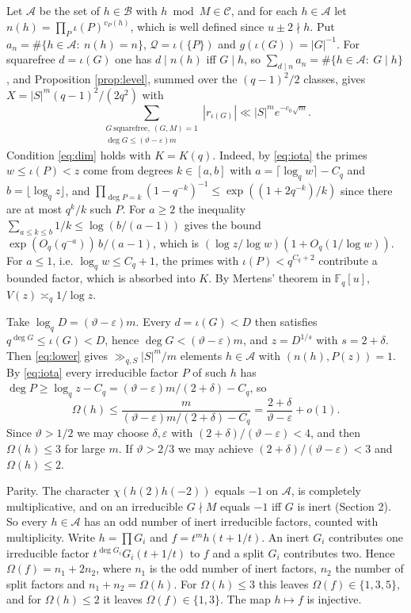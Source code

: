 \documentclass[11pt]{amsart}
\makeatletter
\theoremstyle{definition}
\renewenvironment{proof}[1][\proofname]{\par\pushQED{\qed}\normalfont\topsep6\p@\@plus6\p@\relax\trivlist\item[\hskip\labelsep\upshape #1\@addpunct{.}]\ignorespaces}{\popQED\endtrivlist\@endpefalse}
\newcommand{\F}{\mathbb{F}}
\newcommand{\cB}{\mathcal{B}}
\newcommand{\cC}{\mathcal{C}}
\makeatother
\begin{document}
\begin{proof}[Proof of Corollary \ref{cor:sieve}]
Let $\mathcal A$ be the set of $h\in\cB$ with $h\bmod M\in\cC$, and for each $h\in\mathcal A$ let $n(h)=\prod_P\iota(P)^{v_P(h)}$, which is well defined since $u\pm2\nmid h$. Put $a_n=\#\{h\in\mathcal A:\ n(h)=n\}$, $\mathcal Q=\iota(\{P\})$ and $g(\iota(G))=|G|^{-1}$. For squarefree $d=\iota(G)$ one has $d\mid n(h)$ iff $G\mid h$, so $\sum_{d\mid n}a_n=\#\{h\in\mathcal A:\ G\mid h\}$, and Proposition \ref{prop:level}, summed over the $(q-1)^2/2$ classes, gives $X=|S|^m(q-1)^2/(2q^2)$ with
\[
\sum_{\substack{G\ \text{squarefree},\ (G,M)=1\\ \deg G\le(\vartheta-\varepsilon)m}}|r_{\iota(G)}|\ll|S|^me^{-c_0\sqrt m}.
\]
Condition \eqref{eq:dim} holds with $K=K(q)$. Indeed, by \eqref{eq:iota} the primes $w\le\iota(P)<z$ come from degrees $k\in[a,b]$ with $a=\lceil\log_qw\rceil-C_q$ and $b=\lfloor\log_qz\rfloor$, and $\prod_{\deg P=k}(1-q^{-k})^{-1}\le\exp((1+2q^{-k})/k)$ since there are at most $q^k/k$ such $P$. For $a\ge2$ the inequality $\sum_{a\le k\le b}1/k\le\log(b/(a-1))$ gives the bound $\exp(O_q(q^{-a}))\,b/(a-1)$, which is $(\log z/\log w)(1+O_q(1/\log w))$. For $a\le1$, i.e. $\log_qw\le C_q+1$, the primes with $\iota(P)<q^{C_q+2}$ contribute a bounded factor, which is absorbed into $K$. By Mertens' theorem in $\F_q[u]$, $V(z)\asymp_q1/\log z$.

Take $\log_qD=(\vartheta-\varepsilon)m$. Every $d=\iota(G)<D$ then satisfies $q^{\deg G}\le\iota(G)<D$, hence $\deg G<(\vartheta-\varepsilon)m$, and $z=D^{1/s}$ with $s=2+\delta$. Then \eqref{eq:lower} gives $\gg_{q,S}|S|^m/m$ elements $h\in\mathcal A$ with $(n(h),P(z))=1$. By \eqref{eq:iota} every irreducible factor $P$ of such $h$ has $\deg P\ge\log_qz-C_q=(\vartheta-\varepsilon)m/(2+\delta)-C_q$, so
\[
\Omega(h)\le\frac{m}{(\vartheta-\varepsilon)m/(2+\delta)-C_q}=\frac{2+\delta}{\vartheta-\varepsilon}+o(1).
\]
Since $\vartheta>1/2$ we may choose $\delta,\varepsilon$ with $(2+\delta)/(\vartheta-\varepsilon)<4$, and then $\Omega(h)\le3$ for large $m$. If $\vartheta>2/3$ we may achieve $(2+\delta)/(\vartheta-\varepsilon)<3$ and $\Omega(h)\le2$.

Parity. The character $\chi(h(2)h(-2))$ equals $-1$ on $\mathcal A$, is completely multiplicative, and on an irreducible $G\nmid M$ equals $-1$ iff $G$ is inert (Section 2). So every $h\in\mathcal A$ has an odd number of inert irreducible factors, counted with multiplicity. Write $h=\prod G_i$ and $f=t^mh(t+1/t)$. An inert $G_i$ contributes one irreducible factor $t^{\deg G_i}G_i(t+1/t)$ to $f$ and a split $G_i$ contributes two. Hence $\Omega(f)=n_1+2n_2$, where $n_1$ is the odd number of inert factors, $n_2$ the number of split factors and $n_1+n_2=\Omega(h)$. For $\Omega(h)\le3$ this leaves $\Omega(f)\in\{1,3,5\}$, and for $\Omega(h)\le2$ it leaves $\Omega(f)\in\{1,3\}$. The map $h\mapsto f$ is injective.
\end{proof}
\end{document}
